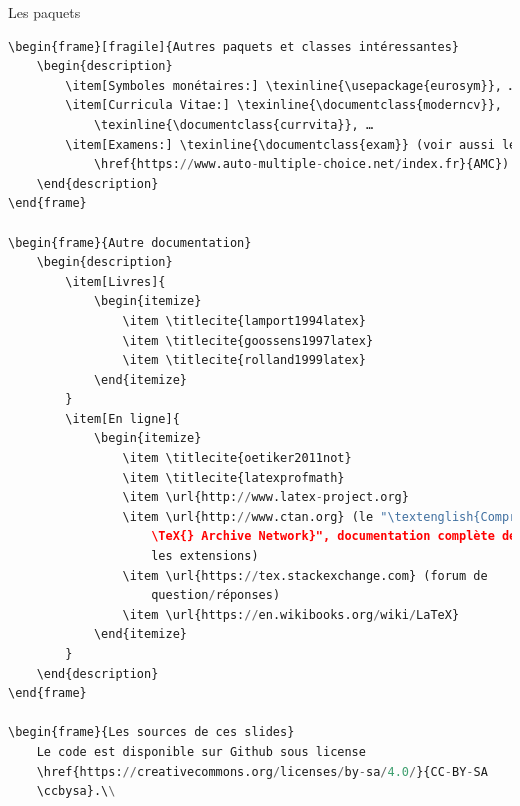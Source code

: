 \documentclass[usenames,dvipsnames,10pt]{beamer} %
\newcommand{\titlecite}[1] {
    \citetitle{#1}\cite{#1}
}
\begin{document}
\begin{frame}[fragile]{Les paquets}
\begin{description}
{\begin{lstlisting}[language=Python]
\begin{frame}[fragile]{Autres paquets et classes intéressantes}
    \begin{description}
        \item[Symboles monétaires:] \texinline{\usepackage{eurosym}}, …
        \item[Curricula Vitae:] \texinline{\documentclass{moderncv}},
            \texinline{\documentclass{currvita}}, …
        \item[Examens:] \texinline{\documentclass{exam}} (voir aussi le logiciel
            \href{https://www.auto-multiple-choice.net/index.fr}{AMC}).
    \end{description}
\end{frame}

\begin{frame}{Autre documentation}
    \begin{description}
        \item[Livres]{
            \begin{itemize}
                \item \titlecite{lamport1994latex}
                \item \titlecite{goossens1997latex}
                \item \titlecite{rolland1999latex}
            \end{itemize}
        }
        \item[En ligne]{
            \begin{itemize}
                \item \titlecite{oetiker2011not}
                \item \titlecite{latexprofmath}
                \item \url{http://www.latex-project.org}
                \item \url{http://www.ctan.org} (le "\textenglish{Comprehensive
                    \TeX{} Archive Network}", documentation complète de toutes
                    les extensions)
                \item \url{https://tex.stackexchange.com} (forum de
                    question/réponses)
                \item \url{https://en.wikibooks.org/wiki/LaTeX}
            \end{itemize}
        }
    \end{description}
\end{frame}

\begin{frame}{Les sources de ces slides}
    Le code est disponible sur Github sous license
    \href{https://creativecommons.org/licenses/by-sa/4.0/}{CC-BY-SA
    \ccbysa}.\\


\end{lstlisting}}
\end{description}
\end{frame}
\end{document}
